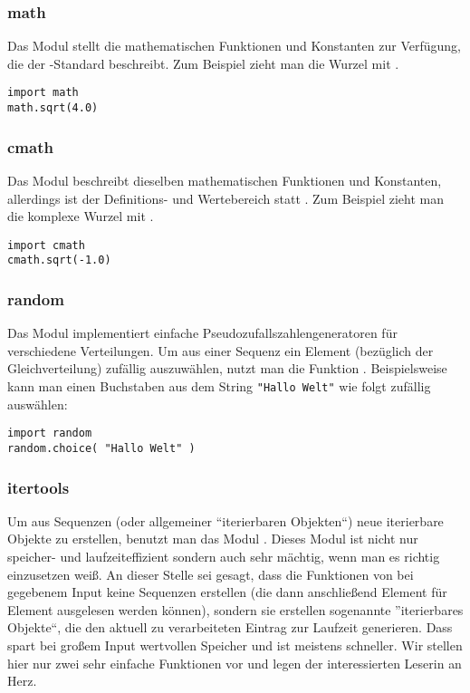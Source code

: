 \subsubsection{math}
\label{section:module:empfohlene_module:math}
Das Modul  stellt die mathematischen Funktionen und Konstanten zur Verfügung, die der \C-Standard beschreibt.
Zum Beispiel zieht man die Wurzel mit .
\begin{lstlisting}
import math
math.sqrt(4.0)
\end{lstlisting}


\subsubsection{cmath}
\label{section:module:empfohlene_module:cmath}
Das Modul  beschreibt dieselben mathematischen Funktionen und Konstanten, allerdings ist der Definitions- und Wertebereich  statt .
Zum Beispiel zieht man die komplexe Wurzel mit .
\begin{lstlisting}
import cmath
cmath.sqrt(-1.0)
\end{lstlisting}


\subsubsection{random}
\label{section:module:empfohlene_module:random}
Das Modul  implementiert einfache Pseudozufallszahlengeneratoren für verschiedene Verteilungen.
Um aus einer Sequenz ein Element (bezüglich der Gleichverteilung) zufällig auszuwählen, nutzt man die Funktion .
Beispielsweise kann man einen Buchstaben aus dem String \lstinline[style=PyInline]|"Hallo Welt"| wie folgt zufällig auswählen:
\begin{lstlisting}
import random
random.choice( "Hallo Welt" )
\end{lstlisting}


\subsubsection{itertools}
\label{section:module:empfohlene_module:itertools}
Um aus Sequenzen (oder allgemeiner ``iterierbaren Objekten``) neue iterierbare Objekte zu erstellen, benutzt man das Modul .
Dieses Modul ist nicht nur speicher- und laufzeiteffizient sondern auch sehr mächtig, wenn man es richtig einzusetzen weiß.
An dieser Stelle sei gesagt, dass die Funktionen von  bei gegebenem Input keine Sequenzen erstellen (die dann anschließend Element für Element ausgelesen werden können),
sondern sie erstellen sogenannte ''iterierbares Objekte``, die den aktuell zu verarbeiteten Eintrag zur Laufzeit generieren.
Dass spart bei großem Input wertvollen Speicher und ist meistens schneller.
Wir stellen hier nur zwei sehr einfache Funktionen vor und legen der interessierten Leserin \cite[Library, Funktional Programming Tools, itertools]{Python3} an Herz.

